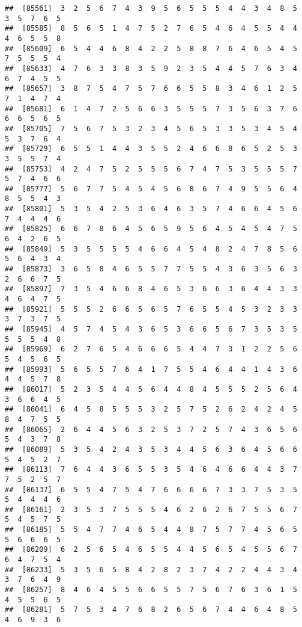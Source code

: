 \documentclass[
]{book}
\begin{document}
\begin{verbatim}
##  [85561]  3  2  5  6  7  4  3  9  5  6  5  5  5  4  4  3  4  8  5  3  5  7  6  5
##  [85585]  8  5  6  5  1  4  7  5  2  7  6  5  4  6  4  5  5  4  4  4  6  5  5  8
##  [85609]  6  5  4  4  6  8  4  2  2  5  8  8  7  6  4  6  5  4  5  7  5  5  5  4
##  [85633]  4  7  6  3  3  8  3  5  9  2  3  5  4  4  5  7  6  3  4  6  7  4  5  5
##  [85657]  3  8  7  5  4  7  5  7  6  6  5  5  8  3  4  6  1  2  5  7  1  4  7  4
##  [85681]  6  1  4  7  2  5  6  6  3  5  5  5  7  3  5  6  3  7  6  6  6  5  6  5
##  [85705]  7  5  6  7  5  3  2  3  4  5  6  5  3  3  5  3  4  5  4  5  3  7  6  4
##  [85729]  6  5  5  1  4  4  3  5  5  2  4  6  6  8  6  5  2  5  3  3  5  5  7  4
##  [85753]  4  2  4  7  5  2  5  5  5  6  7  4  7  5  3  5  5  5  7  5  7  4  6  6
##  [85777]  5  6  7  7  5  4  5  4  5  6  8  6  7  4  9  5  5  6  4  8  5  5  4  3
##  [85801]  5  3  5  4  2  5  3  6  4  6  3  5  7  4  6  6  4  5  6  7  4  4  4  6
##  [85825]  6  6  7  8  6  4  5  6  5  9  5  6  4  5  4  5  4  7  5  6  4  2  6  5
##  [85849]  5  3  5  5  5  5  4  6  6  4  5  4  8  2  4  7  8  5  6  5  6  4  3  4
##  [85873]  3  6  5  8  4  6  5  5  7  7  5  5  4  3  6  3  5  6  3  2  6  6  7  5
##  [85897]  7  3  5  4  6  6  8  4  6  5  3  6  6  3  6  4  4  3  3  4  6  4  7  5
##  [85921]  5  5  5  2  6  6  5  6  5  7  6  5  5  4  5  3  2  3  3  3  7  3  7  5
##  [85945]  4  5  7  4  5  4  3  6  5  3  6  6  5  6  7  3  5  3  5  5  5  5  4  8
##  [85969]  6  2  7  6  5  4  6  6  6  5  4  4  7  3  1  2  2  5  6  5  4  5  6  5
##  [85993]  5  6  5  5  7  6  4  1  7  5  5  4  6  4  4  1  4  3  6  4  4  5  7  8
##  [86017]  5  2  3  5  4  4  5  6  4  4  8  4  5  5  5  2  5  6  4  3  6  6  4  5
##  [86041]  6  4  5  8  5  5  5  3  2  5  7  5  2  6  2  4  2  4  5  8  4  7  5  5
##  [86065]  2  6  4  4  5  6  3  2  5  3  7  2  5  7  4  3  6  5  6  5  4  3  7  8
##  [86089]  5  3  5  4  2  4  3  5  3  4  4  5  6  3  6  4  5  6  6  5  4  5  2  7
##  [86113]  7  6  4  4  3  6  5  5  3  5  4  6  4  6  6  4  4  3  7  7  5  2  5  7
##  [86137]  6  5  5  4  7  5  4  7  6  6  6  6  7  3  3  7  5  3  5  5  4  4  4  6
##  [86161]  2  3  5  3  7  5  5  5  4  6  2  6  2  6  7  5  5  6  7  5  4  5  7  5
##  [86185]  5  5  4  7  7  4  6  5  4  4  8  7  5  7  7  4  5  6  5  5  6  6  6  5
##  [86209]  6  2  5  6  5  4  6  5  5  4  4  5  6  5  4  5  5  6  7  6  4  7  5  4
##  [86233]  5  3  5  6  5  8  4  2  8  2  3  7  4  2  2  4  4  3  4  3  7  6  4  9
##  [86257]  8  4  6  4  5  5  6  6  5  5  7  5  6  7  6  3  6  1  5  4  5  5  6  5
##  [86281]  5  7  5  3  4  7  6  8  2  6  5  6  7  4  4  6  4  8  5  4  6  9  3  6

\end{verbatim}
\end{document}
